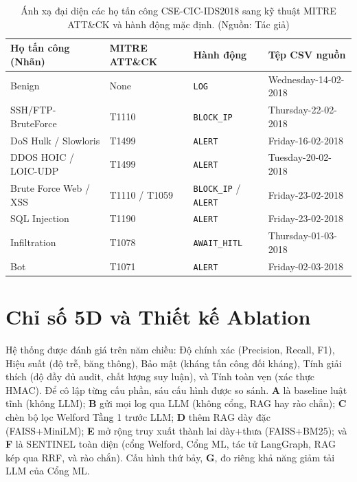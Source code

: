 \begin{table}[!htbp]
    \centering
    \caption{Ánh xạ đại diện các họ tấn công CSE-CIC-IDS2018 sang kỹ thuật MITRE ATT\&CK và hành động mặc định. (Nguồn: Tác giả)}
    \label{tab:dataset_distribution}
    \begin{tabular}{|>{\raggedright\arraybackslash}p{}|>{\centering\arraybackslash}p{}|>{\centering\arraybackslash}p{}|>{\raggedright\arraybackslash}p{}|}
        \hline
        \textbf{Họ tấn công (Nhãn)} & \textbf{MITRE ATT\&CK} & \textbf{Hành động} & \textbf{Tệp CSV nguồn} \\
        \hline
        Benign & None & \texttt{LOG} & Wednesday-14-02-2018 \\ \hline
        SSH/FTP-BruteForce & T1110 & \texttt{BLOCK\_IP} & Thursday-22-02-2018 \\ \hline
        DoS Hulk / Slowloris & T1499 & \texttt{ALERT} & Friday-16-02-2018 \\ \hline
        DDOS HOIC / LOIC-UDP & T1499 & \texttt{ALERT} & Tuesday-20-02-2018 \\ \hline
        Brute Force Web / XSS & T1110 / T1059 & \texttt{BLOCK\_IP} / \texttt{ALERT} & Friday-23-02-2018 \\ \hline
        SQL Injection & T1190 & \texttt{ALERT} & Friday-23-02-2018 \\ \hline
        Infiltration & T1078 & \texttt{AWAIT\_HITL} & Thursday-01-03-2018 \\ \hline
        Bot & T1071 & \texttt{ALERT} & Friday-02-03-2018 \\ \hline
    \end{tabular}
\end{table}

\section{Chỉ số 5D và Thiết kế Ablation}
Hệ thống được đánh giá trên năm chiều: Độ chính xác (Precision, Recall, F1), Hiệu suất (độ trễ, băng thông), Bảo mật (kháng tấn công đối kháng), Tính giải thích (độ đầy đủ audit, chất lượng suy luận), và Tính toàn vẹn (xác thực HMAC). Để cô lập từng cấu phần, sáu cấu hình được so sánh. \textbf{A} là baseline luật tĩnh (không LLM); \textbf{B} gửi mọi log qua LLM (không cổng, RAG hay rào chắn); \textbf{C} chèn bộ lọc Welford Tầng 1 trước LLM; \textbf{D} thêm RAG dày đặc (FAISS+MiniLM); \textbf{E} mở rộng truy xuất thành lai dày+thưa (FAISS+BM25); và \textbf{F} là SENTINEL toàn diện (cổng Welford, Cổng ML, tác tử LangGraph, RAG kép qua RRF, và rào chắn). Cấu hình thứ bảy, \textbf{G}, đo riêng khả năng giảm tải LLM của Cổng ML.


